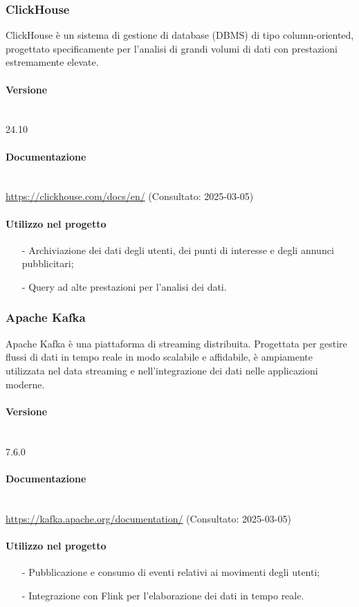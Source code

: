 \documentclass[10pt]{article}
\newcommand{\myparagraph}[1]{\paragraph{#1}\mbox{}\\\vspace{0.4em}}
\begin{document}
\begin{justify}
    \subsubsection{ClickHouse}
    ClickHouse è un sistema di gestione di database (DBMS) di tipo column-oriented, progettato specificamente per l'analisi di grandi volumi di dati con prestazioni estremamente elevate.

    \myparagraph{Versione} 
    24.10 %

    \myparagraph{Documentazione}
    \textcolor{blue}{\url{https://clickhouse.com/docs/en/}} (Consultato: 2025-03-05)
    
    \paragraph{Utilizzo nel progetto}
    \begin{itemize}
        \item[-] Archiviazione dei dati degli utenti, dei punti di interesse e degli annunci pubblicitari;
        \item[-] Query ad alte prestazioni per l'analisi dei dati.
    \end{itemize}

    \subsubsection{Apache Kafka}
    Apache Kafka è una piattaforma di streaming distribuita. Progettata per gestire flussi di dati in tempo reale in modo scalabile e affidabile, è ampiamente utilizzata nel data streaming e nell’integrazione dei dati nelle applicazioni moderne.
    
    \myparagraph{Versione} 
    7.6.0 
    
    \myparagraph{Documentazione} 
    \textcolor{blue}{\url{https://kafka.apache.org/documentation/}} (Consultato: 2025-03-05)
    
    \paragraph{Utilizzo nel progetto}
    \begin{itemize}
        \item[-] Pubblicazione e consumo di eventi relativi ai movimenti degli utenti;
        \item[-] Integrazione con Flink per l'elaborazione dei dati in tempo reale.
    \end{itemize}


\end{justify}
\end{document}
